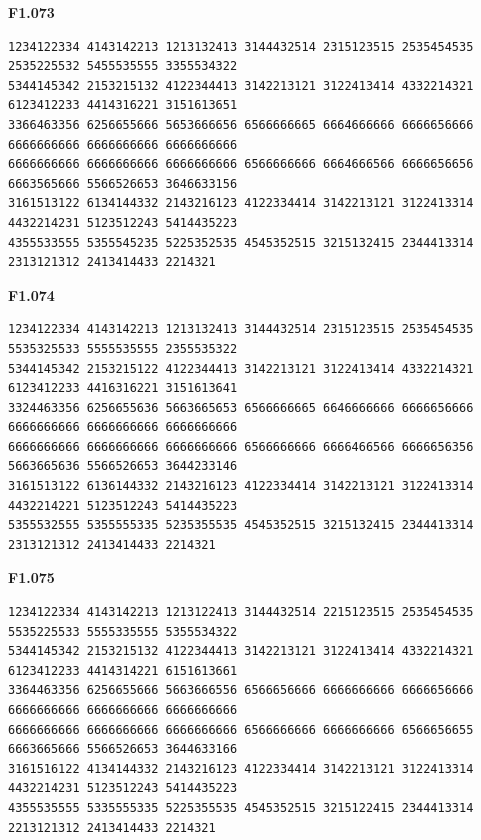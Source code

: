 \noindent\begin{minipage}{\linewidth}\textbf{F1.073}
\begin{lstlisting}
1234122334 4143142213 1213132413 3144432514 2315123515 2535454535 2535225532 5455535555 3355534322
5344145342 2153215132 4122344413 3142213121 3122413414 4332214321 6123412233 4414316221 3151613651
3366463356 6256655666 5653666656 6566666665 6664666666 6666656666 6666666666 6666666666 6666666666
6666666666 6666666666 6666666666 6566666666 6664666566 6666656656 6663565666 5566526653 3646633156
3161513122 6134144332 2143216123 4122334414 3142213121 3122413314 4432214231 5123512243 5414435223
4355533555 5355545235 5225352535 4545352515 3215132415 2344413314 2313121312 2413414433 2214321
\end{lstlisting}
\end{minipage}\par\smallskip

\noindent\begin{minipage}{\linewidth}\textbf{F1.074}
\begin{lstlisting}
1234122334 4143142213 1213132413 3144432514 2315123515 2535454535 5535325533 5555535555 2355535322
5344145342 2153215122 4122344413 3142213121 3122413414 4332214321 6123412233 4416316221 3151613641
3324463356 6256655636 5663665653 6566666665 6646666666 6666656666 6666666666 6666666666 6666666666
6666666666 6666666666 6666666666 6566666666 6666466566 6666656356 5663665636 5566526653 3644233146
3161513122 6136144332 2143216123 4122334414 3142213121 3122413314 4432214221 5123512243 5414435223
5355532555 5355555335 5235355535 4545352515 3215132415 2344413314 2313121312 2413414433 2214321
\end{lstlisting}
\end{minipage}\par\smallskip

\noindent\begin{minipage}{\linewidth}\textbf{F1.075}
\begin{lstlisting}
1234122334 4143142213 1213122413 3144432514 2215123515 2535454535 5535225533 5555335555 5355534322
5344145342 2153215132 4122344413 3142213121 3122413414 4332214321 6123412233 4414314221 6151613661
3364463356 6256655666 5663666556 6566656666 6666666666 6666656666 6666666666 6666666666 6666666666
6666666666 6666666666 6666666666 6566666666 6666666666 6566656655 6663665666 5566526653 3644633166
3161516122 4134144332 2143216123 4122334414 3142213121 3122413314 4432214231 5123512243 5414435223
4355535555 5335555335 5225355535 4545352515 3215122415 2344413314 2213121312 2413414433 2214321
\end{lstlisting}
\end{minipage}\par\smallskip

